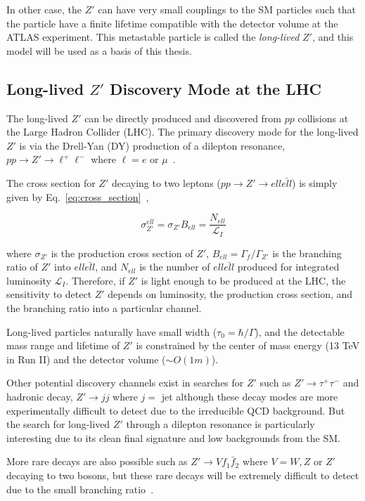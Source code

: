 In other case, the $Z'$ can have very small couplings to the SM particles such that the particle have a finite lifetime compatible with the detector volume at the ATLAS experiment. This metastable particle is called the \textit{long-lived} $Z'$, and this model will be used as a basis of this thesis.



\subsection{Long-lived \texorpdfstring{$Z'$}{Z'} Discovery Mode at the LHC}
\label{sec:intro:zprime_discovery}

The long-lived $Z'$ can be directly produced and discovered from $pp$ collisions at the Large Hadron Collider (LHC). The primary discovery mode for the long-lived $Z'$ is via the Drell-Yan (DY) production of a dilepton resonance, $pp \rightarrow Z' \rightarrow  \ell^{+}\ell^{-}$ where $\ell= e$ or $\mu$~\cite{0034-4885-45-11-002}.

The cross section for $Z'$ decaying to two leptons ($pp \rightarrow Z' \rightarrow ell \bar{ell}$) is simply given by Eq.~\ref{eq:cross_section}~\cite{Langacker:2009su},

\begin{equation}
\label{eq:cross_section}
\sigma^{ell}_{Z'} = \sigma_{Z'} B_{ell} = \frac{N_{ell}}{\mathcal{L}_{I}}
\end{equation}

where $\sigma_{Z'}$ is the production cross section of $Z'$, $B_{ell} = \Gamma_{f} / \Gamma_{Z'}$ is the branching ratio of $Z'$ into $ell\bar{ell}$, and $N_{ell}$ is the number of $ell\bar{ell}$ produced for integrated luminosity $\mathcal{L}_{I}$. Therefore, if $Z'$ is light enough to be produced at the LHC, the sensitivity to detect $Z'$ depends on luminosity, the production cross section, and the branching ratio into a particular channel.

Long-lived particles naturally have small width ($\tau_{0} = \hbar / \Gamma$), and the detectable mass range and lifetime of $Z'$ is constrained by the center of mass energy (13 TeV in Run II) and the detector volume ($\sim O(1m)$). 

Other potential discovery channels exist in searches for $Z'$ such as $Z' \rightarrow \tau^{+}\tau^{-}$ and hadronic decay, $Z' \rightarrow jj$ where $j =$ jet although these decay modes are more experimentally difficult to detect due to the irreducible QCD background. But the search for long-lived $Z'$ through a dilepton resonance is particularly interesting due to its clean final signature and low backgrounds from the SM.

More rare decays are also possible such as $Z' \rightarrow V f_{1} \bar{f}_{2}$ where $V = W, Z$ or $Z'$ decaying to two bosons, but these rare decays will be extremely difficult to detect due to the small branching ratio~\cite{Langacker:2009su}.

